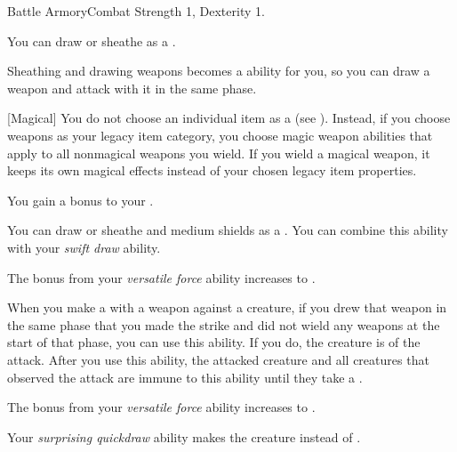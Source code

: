     \begin{feat}{Battle Armory}{Combat}
        \featpre Strength 1, Dexterity 1.

         You can draw or sheathe  as a .

         Sheathing and drawing weapons becomes a  ability for you, so you can draw a weapon and attack with it in the same phase.

        [Magical] You do not choose an individual item as a  (see ).
        Instead, if you choose weapons as your legacy item category, you choose magic weapon abilities that apply to all nonmagical weapons you wield.
        If you wield a magical weapon, it keeps its own magical effects instead of your chosen legacy item properties.

         You gain a  bonus to your .

         You can draw or sheathe  and medium shields as a .
        You can combine this ability with your \textit{swift draw} ability.

         The bonus from your \textit{versatile force} ability increases to .

         When you make a  with a weapon against a creature, if you drew that weapon in the same phase that you made the strike and did not wield any weapons at the start of that phase, you can use this ability.
        If you do, the creature is \partiallyunaware of the attack.
        After you use this ability, the attacked creature and all creatures that observed the attack are immune to this ability until they take a .

         The bonus from your \textit{versatile force} ability increases to .

         Your \textit{surprising quickdraw} ability makes the creature \unaware instead of \partiallyunaware.
    \end{feat}

